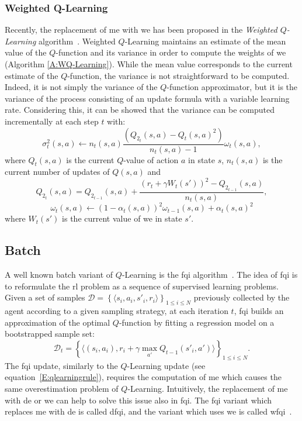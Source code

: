 \subsubsection{Weighted Q-Learning}
Recently, the replacement of \gls{me} with \gls{we} has been proposed in the \textit{Weighted $Q$-Learning} algorithm~\cite{deramo2016estimating}. Weighted $Q$-Learning maintains an estimate of the mean value of the $Q$-function and its variance in order to compute the weights of \gls{we} (Algorithm \ref{A:WQ-Learning}).
While the mean value corresponds to the current estimate of the $Q$-function, the variance is not straightforward to be computed. Indeed, it is not simply the variance of the $Q$-function approximator, but it is the variance of the process consisting of an update formula with a variable learning rate. Considering this, it can be showed that the variance can be computed incrementally at each step $t$ with:
$$\sigma^2_t(s,a) \leftarrow n_t(s,a) \dfrac{(Q_{2_t}(s,a) - Q_t(s,a)^2)}{n_t(s,a) - 1} \omega_t(s,a),$$
where $Q_t(s,a)$ is the current $Q$-value of action $a$ in state $s$, $n_t(s,a)$ is the current number of updates of $Q(s,a)$ and
$$Q_{2_t}(s,a) = Q_{2_{t-1}}(s,a) + \dfrac{(r_t + \gamma W_t(s'))^2 - Q_{2_{t-1}}(s,a)}{n_t(s,a)},$$
$$\omega_t(s,a) \leftarrow (1 - \alpha_t(s,a))^2 \omega_{t-1}(s,a) + \alpha_t(s,a)^2$$
where $W_t(s')$ is the current value of \gls{we} in state $s'$.

\subsection{Batch}
A well known batch variant of $Q$-Learning is the \gls{fqi} algorithm~\cite{Ernst2005tree}. The idea of \gls{fqi} is to reformulate the \gls{rl} problem as a sequence of supervised learning problems.
Given a set of samples $\mathcal{D} = \left\{\langle s_i, a_i, s'_i, r_i \rangle \right\}_{1\leq i\leq N}$ previously collected by the agent according to a given sampling strategy, at each iteration $t$, \gls{fqi} builds an approximation of the optimal $Q$-function by fitting a regression model on a bootstrapped sample set:
\begin{equation}
 \mathcal{D}_t = \left\{ \langle (s_i,a_i), r_i + \gamma \max_{a'} Q_{t-1}\left(s'_i, a'\right) \rangle\right\}_{1 \leq i \leq N}.
\end{equation}
The \gls{fqi} update, similarly to the $Q$-Learning update (see equation~\ref{E:qlearningrule}), requires the computation of \gls{me} which causes the same overestimation problem of $Q$-Learning. Intuitively, the replacement of \gls{me} with \gls{de} or \gls{we} can help to solve this issue also in \gls{fqi}. The \gls{fqi} variant which replaces \gls{me} with \gls{de} is called \gls{dfqi}, and the variant which uses \gls{we} is called \gls{wfqi}~\cite{deramo2017maximum}.
